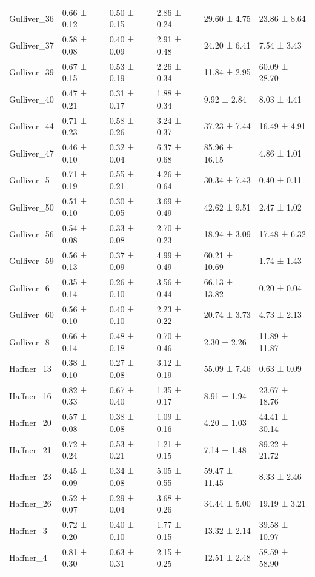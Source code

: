 \begin{tabular}{llllll}
Gulliver_36 & 0.66 ± 0.12 & 0.50 ± 0.15 & 2.86 ± 0.24 & 29.60 ± 4.75 & 23.86 ± 8.64 \\
Gulliver_37 & 0.58 ± 0.08 & 0.40 ± 0.09 & 2.91 ± 0.48 & 24.20 ± 6.41 & 7.54 ± 3.43 \\
Gulliver_39 & 0.67 ± 0.15 & 0.53 ± 0.19 & 2.26 ± 0.34 & 11.84 ± 2.95 & 60.09 ± 28.70 \\
Gulliver_40 & 0.47 ± 0.21 & 0.31 ± 0.17 & 1.88 ± 0.34 & 9.92 ± 2.84 & 8.03 ± 4.41 \\
Gulliver_44 & 0.71 ± 0.23 & 0.58 ± 0.26 & 3.24 ± 0.37 & 37.23 ± 7.44 & 16.49 ± 4.91 \\
Gulliver_47 & 0.46 ± 0.10 & 0.32 ± 0.04 & 6.37 ± 0.68 & 85.96 ± 16.15 & 4.86 ± 1.01 \\
Gulliver_5 & 0.71 ± 0.19 & 0.55 ± 0.21 & 4.26 ± 0.64 & 30.34 ± 7.43 & 0.40 ± 0.11 \\
Gulliver_50 & 0.51 ± 0.10 & 0.30 ± 0.05 & 3.69 ± 0.49 & 42.62 ± 9.51 & 2.47 ± 1.02 \\
Gulliver_56 & 0.54 ± 0.08 & 0.33 ± 0.08 & 2.70 ± 0.23 & 18.94 ± 3.09 & 17.48 ± 6.32 \\
Gulliver_59 & 0.56 ± 0.13 & 0.37 ± 0.09 & 4.99 ± 0.49 & 60.21 ± 10.69 & 1.74 ± 1.43 \\
Gulliver_6 & 0.35 ± 0.14 & 0.26 ± 0.10 & 3.56 ± 0.44 & 66.13 ± 13.82 & 0.20 ± 0.04 \\
Gulliver_60 & 0.56 ± 0.10 & 0.40 ± 0.10 & 2.23 ± 0.22 & 20.74 ± 3.73 & 4.73 ± 2.13 \\
Gulliver_8 & 0.66 ± 0.14 & 0.48 ± 0.18 & 0.70 ± 0.46 & 2.30 ± 2.26 & 11.89 ± 11.87 \\
Haffner_13 & 0.38 ± 0.10 & 0.27 ± 0.08 & 3.12 ± 0.19 & 55.09 ± 7.46 & 0.63 ± 0.09 \\
Haffner_16 & 0.82 ± 0.33 & 0.67 ± 0.40 & 1.35 ± 0.17 & 8.91 ± 1.94 & 23.67 ± 18.76 \\
Haffner_20 & 0.57 ± 0.08 & 0.38 ± 0.08 & 1.09 ± 0.16 & 4.20 ± 1.03 & 44.41 ± 30.14 \\
Haffner_21 & 0.72 ± 0.24 & 0.53 ± 0.21 & 1.21 ± 0.15 & 7.14 ± 1.48 & 89.22 ± 21.72 \\
Haffner_23 & 0.45 ± 0.09 & 0.34 ± 0.08 & 5.05 ± 0.55 & 59.47 ± 11.45 & 8.33 ± 2.46 \\
Haffner_26 & 0.52 ± 0.07 & 0.29 ± 0.04 & 3.68 ± 0.26 & 34.44 ± 5.00 & 19.19 ± 3.21 \\
Haffner_3 & 0.72 ± 0.20 & 0.40 ± 0.10 & 1.77 ± 0.15 & 13.32 ± 2.14 & 39.58 ± 10.97 \\
Haffner_4 & 0.81 ± 0.30 & 0.63 ± 0.31 & 2.15 ± 0.25 & 12.51 ± 2.48 & 58.59 ± 58.90 \\

\end{tabular}
